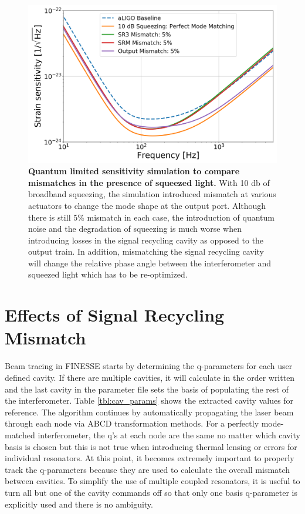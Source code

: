 	\begin{figure}[t!]
		\centering
		\includegraphics[width=1.0 \textwidth]{../Figures/QM_sens_compare_mismatches.png}
		\caption[Quantum limited sensitivity simulation to compare mismatches in the presence of squeezed light.]
		{\textbf{Quantum limited sensitivity simulation to compare mismatches in the presence of squeezed light.} 
			With 10 db of broadband squeezing, the simulation introduced mismatch at various actuators to change the mode shape at the output port.  Although there is still 5\% mismatch in each case, the introduction of quantum noise and the degradation of squeezing is much worse when introducing losses in the signal recycling cavity as opposed to the output train.  In addition, mismatching the signal recycling cavity will change the relative phase angle between the interferometer and squeezed light which has to be re-optimized.	
		}
		\label{fig:QM_lim_sens_mismatch}
	\end{figure}
	\section{Effects of Signal Recycling Mismatch}
	Beam tracing in FINESSE starts by determining the q-parameters for each user defined cavity. If there are multiple cavities, it will calculate in the order written and the last cavity in the parameter file sets the basis of populating the rest of the interferometer.  Table \ref{tbl:cav_params} shows the extracted cavity values for reference.  The algorithm continues by automatically propagating the laser beam through each node via ABCD transformation methods. For a perfectly mode-matched interferometer, the q's at each node are the same no matter which cavity basis is chosen but this is not true when introducing thermal lensing or errors for individual resonators.   At this point, it becomes extremely important to properly track the q-parameters because they are used to calculate the overall mismatch between cavities. To simplify the use of multiple coupled resonators, it is useful to turn all but one of the cavity commands off so that only one basis q-parameter is explicitly used and there is no ambiguity.  
	
